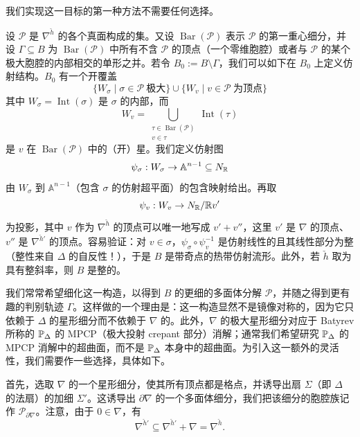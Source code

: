 我们实现这一目标的第一种方法不需要任何选择。

设 $\mathcal{P}$ 是 $\nabla^{\check h}$ 的各个真面构成的集。又设 $\operatorname{Bar}(\mathcal{P})$ 表示 $\mathcal{P}$ 的第一重心细分，并设 $\Gamma\subseteq B$ 为 $\operatorname{Bar}(\mathcal{P})$ 中所有不含 $\mathcal{P}$ 的顶点（一个零维胞腔）或者与 $\mathcal{P}$ 的某个极大胞腔的内部相交的单形之并。若令 $B_0:=B\setminus\Gamma$，我们可以如下在 $B_0$ 上定义仿射结构。$B_0$ 有一个开覆盖
\[
\{W_\sigma \mid \sigma\in\mathcal{P}\ \text{极大}\}\cup\{W_v \mid v\in\mathcal{P}\ \text{为顶点}\}
\]
其中 $W_\sigma=\operatorname{Int}(\sigma)$ 是 $\sigma$ 的内部，而
\[
W_v=\bigcup_{\substack{\tau\in\operatorname{Bar}(\mathcal{P})\\ v\in\tau}}\operatorname{Int}(\tau)
\]
是 $v$ 在 $\operatorname{Bar}(\mathcal{P})$ 中的（开）星。我们定义仿射图
\[
\psi_\sigma: W_\sigma\to\mathbb{A}^{n-1}\subseteq N_{\mathbb{R}}
\]
由 $W_\sigma$ 到 $\mathbb{A}^{n-1}$（包含 $\sigma$ 的仿射超平面）的包含映射给出。再取
\[
\psi_v: W_v\to N_{\mathbb{R}}/\mathbb{R} v'
\]
为投影，其中 $v$ 作为 $\nabla^{\check h}$ 的顶点可以唯一地写成 $v'+v''$，这里 $v'$ 是 $\nabla$ 的顶点、$v''$ 是 $\nabla^{\check h'}$ 的顶点。容易验证：对 $v\in\sigma$，$\psi_\sigma\circ\psi_v^{-1}$ 是仿射线性的且其线性部分为整（整性来自 $\Delta$ 的自反性！），于是 $B$ 是带奇点的热带仿射流形。此外，若 $\check h$ 取为具有整斜率，则 $B$ 是整的。



我们常常希望细化这一构造，以得到 $B$ 的更细的多面体分解 $\mathcal{P}$，并随之得到更有趣的判别轨迹 $\Gamma$。这样做的一个理由是：这一构造显然不是镜像对称的，因为它只依赖于 $\Delta$ 的星形细分而不依赖于 $\nabla$ 的。此外，$\nabla$ 的极大星形细分对应于 Batyrev 所称的 $\mathbb{P}_\Delta$ 的 MPCP（极大投射 crepant 部分）消解；通常我们希望研究 $\mathbb{P}_\Delta$ 的 MPCP 消解中的超曲面，而不是 $\mathbb{P}_\Delta$ 本身中的超曲面。为引入这一额外的灵活性，我们需要作一些选择，具体如下。

首先，选取 $\nabla$ 的一个星形细分，使其所有顶点都是格点，并诱导出扇 $\Sigma$（即 $\Delta$ 的法扇）的加细 $\Sigma'$。这诱导出 $\partial\nabla$ 的一个多面体细分，我们把该细分的胞腔族记作 $\mathcal{P}_{\partial\nabla}$。注意，由于 $0\in\nabla$，有
\[
\nabla^{\check h'}\subseteq\nabla^{\check h'}+\nabla=\nabla^{\check h}.
\]

